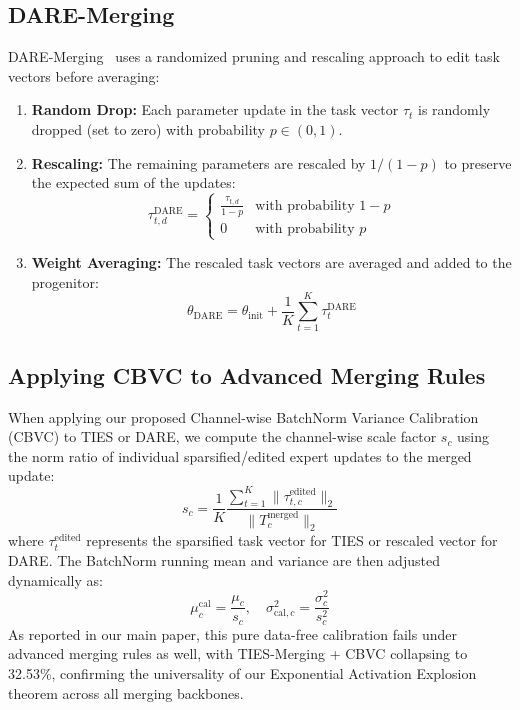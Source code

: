 \documentclass{article}
\begin{document}
\subsection{DARE-Merging}
DARE-Merging~\cite{yu2024dare} uses a randomized pruning and rescaling approach to edit task vectors before averaging:
\begin{enumerate}
    \item \textbf{Random Drop:} Each parameter update in the task vector $\tau_t$ is randomly dropped (set to zero) with probability $p \in (0, 1)$.
    \item \textbf{Rescaling:} The remaining parameters are rescaled by $1/(1-p)$ to preserve the expected sum of the updates:
    \begin{equation}
        \tau^{\text{DARE}}_{t, d} = \begin{cases} 
            \frac{\tau_{t, d}}{1-p} & \text{with probability } 1-p \\
            0 & \text{with probability } p
        \end{cases}
    \end{equation}
    \item \textbf{Weight Averaging:} The rescaled task vectors are averaged and added to the progenitor:
    \begin{equation}
        \theta_{\text{DARE}} = \theta_{\text{init}} + \frac{1}{K} \sum_{t=1}^K \tau^{\text{DARE}}_t
    \end{equation}
\end{enumerate}

\subsection{Applying CBVC to Advanced Merging Rules}
When applying our proposed Channel-wise BatchNorm Variance Calibration (CBVC) to TIES or DARE, we compute the channel-wise scale factor $s_c$ using the norm ratio of individual sparsified/edited expert updates to the merged update:
\begin{equation}
    s_c = \frac{1}{K} \frac{\sum_{t=1}^K \| \tau^{\text{edited}}_{t, c} \|_2}{\| T^{\text{merged}}_{c} \|_2}
\end{equation}
where $\tau^{\text{edited}}_t$ represents the sparsified task vector for TIES or rescaled vector for DARE. The BatchNorm running mean and variance are then adjusted dynamically as:
\begin{equation}
    \mu^{\text{cal}}_c = \frac{\mu_c}{s_c}, \quad \sigma^2_{\text{cal}, c} = \frac{\sigma^2_c}{s_c^2}
\end{equation}
As reported in our main paper, this pure data-free calibration fails under advanced merging rules as well, with TIES-Merging + CBVC collapsing to 32.53\%, confirming the universality of our Exponential Activation Explosion theorem across all merging backbones.
\end{document}
